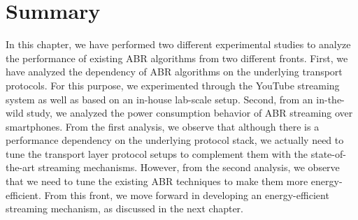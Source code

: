 \section{Summary}
\label{sec:chap03:summary}
In this chapter, we have performed two different experimental studies to analyze the performance of existing ABR algorithms from two different fronts. First, we have analyzed the dependency of ABR algorithms on the underlying transport protocols. For this purpose, we experimented through the YouTube streaming system as well as based on an in-house lab-scale setup. Second, from an in-the-wild study, we analyzed the power consumption behavior of ABR streaming over smartphones. From the first analysis, we observe that although there is a performance dependency on the underlying protocol stack, we actually need to tune the transport layer protocol setups to complement them with the state-of-the-art streaming mechanisms. However, from the second analysis, we observe that we need to tune the existing ABR techniques to make them more energy-efficient. From this front, we move forward in developing an energy-efficient streaming mechanism, as discussed in the next chapter.